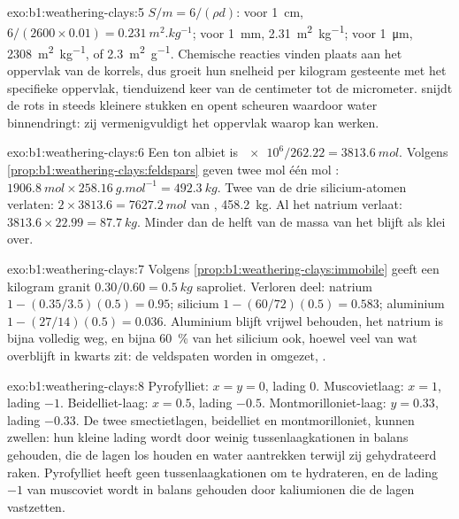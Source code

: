 \begin{solution}{exo:b1:weathering-clays:5}
$S/m = 6/(\rho d)$: voor \qty{1}{cm}, $6/(2600\times0.01) =
\qty{0.231}{m^2.kg^{-1}}$; voor \qty{1}{mm}, \qty{2.31}{m^2.kg^{-1}}; voor
\qty{1}{\micro m}, \qty{2308}{m^2.kg^{-1}}, of \qty{2.3}{m^2.g^{-1}}.
Chemische reacties vinden plaats aan het oppervlak van de korrels, dus groeit hun
snelheid per kilogram gesteente met het specifieke oppervlak, tienduizend keer van de
centimeter tot de micrometer.  snijdt de rots in steeds kleinere
stukken en opent scheuren waardoor water binnendringt: zij vermenigvuldigt het oppervlak
waarop  kan werken.
\end{solution}

\begin{solution}{exo:b1:weathering-clays:6}
Een ton albiet is $\num{e6}/262.22 = \qty{3813.6}{mol}$. Volgens
\cref{prop:b1:weathering-clays:feldspars} geven twee mol één mol :
$\qty{1906.8}{mol} \times \qty{258.16}{g.mol^{-1}} = \qty{492.3}{kg}$. Twee van de drie
silicium-atomen verlaten: $2\times3813.6 = \qty{7627.2}{mol}$ van
, \qty{458.2}{kg}. Al het natrium verlaat: $3813.6\times22.99 =
\qty{87.7}{kg}$. Minder dan de helft van de massa van het  blijft als klei over.
\end{solution}

\begin{solution}{exo:b1:weathering-clays:7}
Volgens \cref{prop:b1:weathering-clays:immobile} geeft een kilogram granit
$0.30/0.60 = \qty{0.5}{kg}$ saproliet. Verloren deel: natrium $1 -
(0.35/3.5)(0.5) = 0.95$; silicium $1 - (60/72)(0.5) = 0.583$; aluminium $1 -
(27/14)(0.5) = 0.036$. Aluminium blijft vrijwel behouden, het natrium is bijna volledig
weg, en bijna \qty{60}{\percent} van het silicium ook, hoewel veel van wat overblijft in
kwarts zit: de veldspaten worden in  omgezet, .
\end{solution}

\begin{solution}{exo:b1:weathering-clays:8}
Pyrofylliet: $x = y = 0$, lading 0. Muscovietlaag: $x = 1$, lading $-1$.
Beidelliet-laag: $x = 0.5$, lading $-0.5$. Montmorilloniet-laag: $y = 0.33$,
lading $-0.33$. De twee smectietlagen, beidelliet en montmorilloniet, kunnen
zwellen: hun kleine lading wordt door weinig tussenlaagkationen in balans gehouden, die
de lagen los houden en water aantrekken terwijl zij gehydrateerd raken. Pyrofylliet heeft
geen tussenlaagkationen om te hydrateren, en de lading $-1$ van muscoviet wordt in balans
gehouden door kaliumionen die de lagen vastzetten.
\end{solution}

